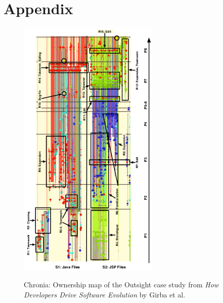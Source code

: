 \onecolumn
\makeatletter
\setlength{\@fptop}{0pt plus 1fil}
\setlength{\@fpbot}{0pt plus 1fil}
\makeatletter

\section{Appendix}

\begin{figure}[H]
\centering
\includegraphics[width=0.6\textwidth]{./resources/annex_outsight.png}~
\caption{Chronia\cite{Chronia}: Ownership map of the Outsight case study from \emph{How Developers Drive Software Evolution}\cite{Girba2005} by Girba et al.}
\label{fig:annex_ownership_outsight}
\end{figure}

